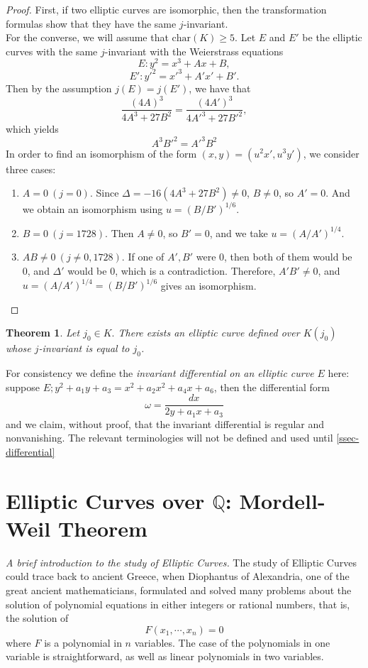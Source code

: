 \documentclass[12pt]{article}
\newtheorem{theorem}{Theorem}[subsection]
\theoremstyle{remark}
\theoremstyle{definition}
\newcommand{\w}[0]{\omega}
\begin{document}
    \begin{proof}
        First, if two elliptic curves are isomorphic, then the transformation formulas show that they have the same $j$-invariant.\\
        For the converse, we will assume that $\text{char} (K)\geq 5.$ Let $E$ and $E'$ be the elliptic curves with the same $j$-invariant with the Weierstrass equations$$E: y^2=x^3+Ax+B,$$ $$E': y'^2=x'^3+A'x'+B'.$$
        Then by the assumption $j(E)=j(E')$, we have that $$\frac{(4A)^3}{4A^3+27B^2} = \frac{(4A')^3}{4A'^3+27B'^2},$$ which yields $$A^3B'^2=A'^3B^2$$
        In order to find an isomorphism of the form $(x,y)=(u^2x',u^3y')$, we consider three cases:
        \begin{enumerate}[\normalfont(i)]
            \item $A=0\ (j=0).$ Since $\Delta = -16(4A^3+27B^2)\neq 0$, $B\neq 0$, so $A'=0$. And we obtain an isomorphism using $u=(B/B')^{1/6}.$
            \item $B=0\ (j=1728).$ Then $A\neq 0$, so $B'=0$, and we take $u=(A/A')^{1/4}.$
            \item $AB\neq 0\ (j\neq 0,1728).$ If one of $A', B'$ were 0, then both of them would be 0, and $\Delta '$ would be 0, which is a contradiction. Therefore, $A'B'\neq 0$, and $u=(A/A')^{1/4}=(B/B')^{1/6}$ gives an isomorphism.  
        \end{enumerate}
    \end{proof}
    \begin{theorem}
        Let $j_0\in K.$ There exists an elliptic curve defined over $K(j_0)$ whose $j$-invariant is equal to $j_0$.
    \end{theorem}
    
    For consistency we define the \textit{invariant differential on an elliptic curve $E$} here: suppose $E;y^2+a_1y+a_3=x^2+a_2x^2+a_4x+a_6$, then the differential form
    \[\w=\frac{dx}{2y+a_1x+a_3}\]
    and we claim, without proof, that the invariant differential is regular and nonvanishing. The relevant terminologies will not be defined and used until \autoref{ssec-differential}





    \section{Elliptic Curves over $\mathbb Q$: Mordell-Weil Theorem}
        \textit{A brief introduction to the study of Elliptic Curves.}
        The study of Elliptic Curves could trace back to ancient Greece, when Diophantus of Alexandria, one of the great ancient mathematicians, formulated and solved many problems about the solution of polynomial equations in either integers or rational numbers, that is, the solution of
        $$F(x_1,\cdots,x_n)=0$$
        where $F$ is a polynomial in $n$ variables. The case of the polynomials in one variable is straightforward, as well as linear polynomials in two variables.
        
\end{document}
